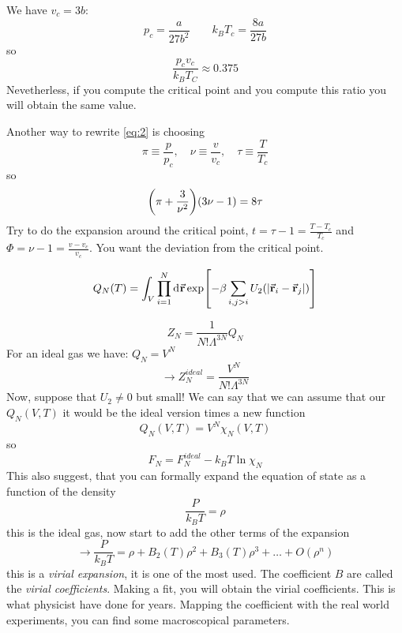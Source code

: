 \documentclass[../main/main.tex]{subfiles}
\begin{document}
We have  \( v_c = 3 b \):
\begin{equation}
  p_c = \frac{a}{27 b^2} \qquad k_B T_c = \frac{8a}{27b}
\end{equation}
so
\begin{equation}
  \frac{p_c v_c}{k_B T_C} \approx 0.375
\end{equation}
Nevetherless, if you compute the critical point and you compute this ratio you will obtain the same value.

Another way to rewrite \eqref{eq:2} is choosing
\begin{equation}
  \pi \equiv \frac{p}{p_c}, \quad \nu  \equiv \frac{v}{v_c}, \quad \tau \equiv \frac{T}{T_c}
\end{equation}
so
\begin{equation}
  \qty(\pi + \frac{3}{\nu ^2}) \qty(3 \nu -1) = 8 \tau
\end{equation}
Try to do the expansion around the critical point, \( t = \tau -1 = \frac{T-T_c}{T_c}\) and \( \Phi = \nu -1 = \frac{v-v_c}{v_c} \). You want the deviation from the critical point.


\begin{equation}
  Q_N (T) = \int_{V}^{} \prod_{i=1}^{N}  \dd[]{\va{r}}  \exp [-\beta \sum_{i,j > i }^{}  U_2 ( \abs{\va{r}_i - \va{r}_j} ) ]
\end{equation}

\begin{equation}
  Z_N = \frac{1}{N! \Lambda ^{3N} } Q_N
\end{equation}
For an ideal gas we have: \( Q_N = V^N \)
\begin{equation}
  \rightarrow Z_N^{ideal} = \frac{V^N}{N! \Lambda ^{3N}}
\end{equation}
Now, suppose that \( U_2 \neq 0  \) but small! We can say that we can assume that our \( Q_N (V,T) \) it would be the ideal version times a new function
\begin{equation}
  Q_N (V,T)=V^N \chi _N (V,T)
\end{equation}
so
\begin{equation}
  F_N = F_N^{ideal} - k_B T \ln{\chi _N}
\end{equation}
This also suggest, that you can formally expand the equation of state as a function of the density
\begin{equation}
  \frac{P}{k_B T} = \rho
\end{equation}
this is the ideal gas, now start to add the other terms of the expansion
\begin{equation}
  \rightarrow \frac{P}{k_B T} = \rho + B_2 (T) \rho ^2 + B_3 (T)\rho ^3+ \dots + O(\rho ^n)
\end{equation}
this is a \emph{virial expansion}, it is one of the most used. The coefficient \( B \) are called the \emph{virial coefficients}.  Making a fit, you will obtain the virial coefficients. This is what physicist have done for years. Mapping the coefficient with the real world experiments, you can find some macroscopical parameters.
\end{document}
